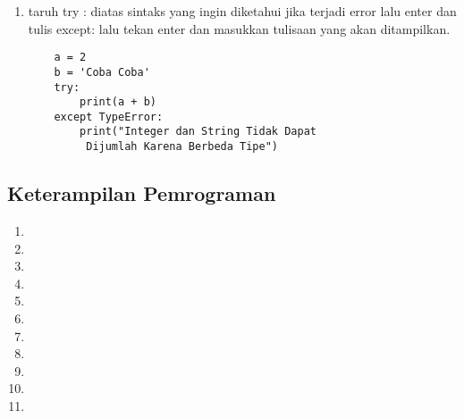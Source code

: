 \begin{enumerate}
	\item taruh try : diatas sintaks yang ingin diketahui jika terjadi error lalu enter dan tulis except: lalu tekan enter 
dan masukkan tulisaan yang akan ditampilkan.
	\begin{verbatim}
	a = 2
	b = 'Coba Coba'
	try:
    	print(a + b)
	except TypeError:
    	print("Integer dan String Tidak Dapat
    	 Dijumlah Karena Berbeda Tipe")
	\end{verbatim}

\end{enumerate}
\subsection{Keterampilan Pemrograman}
\begin{enumerate}
	\item 

	\item 

	\item 

	\item 

	\item 

	\item 

	\item 

	\item 

	\item 

	\item 
	
	\item 
\end{enumerate}
